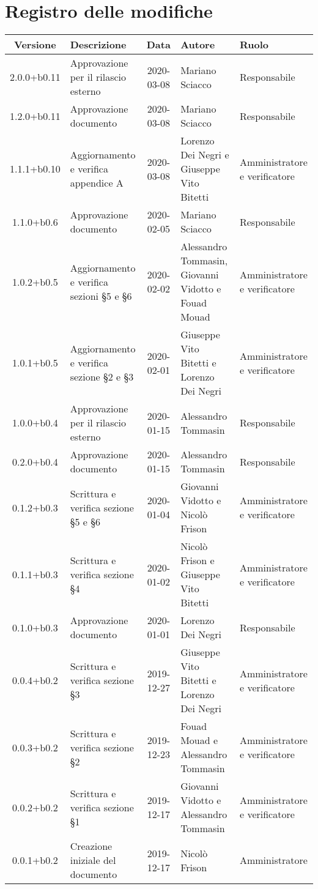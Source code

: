 \section*{Registro delle modifiche}

\begin{center}
	\begin{longtable}{|c|p{3cm}|c|p{4cm}|p{2.5cm}|}
	\hline
	\rowcolor{lighter-grayer}
	\textbf{Versione} & \textbf{Descrizione} & \textbf{Data} & \textbf{Autore} & \textbf{Ruolo} \\
	\hline
	\endfirsthead

	2.0.0+b0.11 & Approvazione per il rilascio esterno  & 2020-03-08 & Mariano Sciacco & Responsabile \\
	\hline
	1.2.0+b0.11 & Approvazione documento & 2020-03-08 & Mariano Sciacco & Responsabile \\
	\hline
	1.1.1+b0.10 & Aggiornamento e verifica appendice A  & 2020-03-08 & Lorenzo Dei Negri e Giuseppe Vito Bitetti & Amministratore e verificatore \\
	\hline
	1.1.0+b0.6 & Approvazione documento & 2020-02-05 & Mariano Sciacco & Responsabile \\
	\hline
	1.0.2+b0.5 & Aggiornamento e verifica sezioni \S5 e \S6  & 2020-02-02 & Alessandro Tommasin, Giovanni Vidotto e Fouad Mouad & Amministratore e verificatore \\
	\hline
	1.0.1+b0.5 & Aggiornamento e verifica sezione \S2 e \S3  & 2020-02-01 & Giuseppe Vito Bitetti e Lorenzo Dei Negri & Amministratore e verificatore \\
	\hline
	1.0.0+b0.4 & Approvazione per il rilascio esterno & 2020-01-15 & Alessandro Tommasin & Responsabile \\
	\hline
	0.2.0+b0.4 & Approvazione documento & 2020-01-15 & Alessandro Tommasin & Responsabile \\
	\hline
	0.1.2+b0.3 & Scrittura e verifica sezione \S5 e \S6 & 2020-01-04 & Giovanni Vidotto e Nicolò Frison & Amministratore e verificatore \\
	\hline
	0.1.1+b0.3 &  Scrittura e verifica sezione \S4 & 2020-01-02 & Nicolò Frison e Giuseppe Vito Bitetti & Amministratore e verificatore \\
	\hline
	0.1.0+b0.3 & Approvazione documento & 2020-01-01 & Lorenzo Dei Negri & Responsabile \\
	\hline
	0.0.4+b0.2 & Scrittura e verifica sezione \S3 & 2019-12-27  & Giuseppe Vito Bitetti e Lorenzo Dei Negri & Amministratore e verificatore \\
	\hline
	0.0.3+b0.2 & Scrittura e verifica sezione \S2 & 2019-12-23 & Fouad Mouad e Alessandro Tommasin & Amministratore e verificatore \\
	\hline
	0.0.2+b0.2 & Scrittura e verifica sezione \S1 & 2019-12-17 & Giovanni Vidotto e Alessandro Tommasin & Amministratore e verificatore \\
	\hline
	0.0.1+b0.2 & Creazione iniziale del documento & 2019-12-17 & Nicolò Frison & Amministratore \\
	\hline

	\end{longtable}
\end{center}
